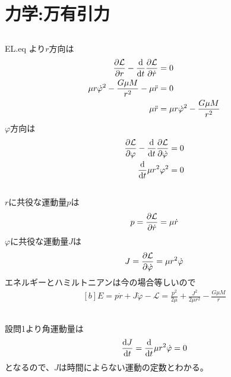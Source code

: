 \documentclass[../../sp_2018.tex]{subfiles}
\begin{document}
\setcounter{section}{2}
\section{力学:万有引力}
\subsection{}
EL.eq より\(r\)方向は
\begin{equation}\begin{aligned}[b]
    \pdv{\mathcal{L}}{r}-\dv{t}\pdv{\mathcal{L}}{\dot{r}} &=0\\
    \mu r\dot{\varphi}^2-\frac{G\mu M}{r^2} -\mu\ddot{r} &=0\\
    \mu\ddot{r} &= \mu r\dot{\varphi}^2 - \frac{G\mu M}{r^2}
\end{aligned}\end{equation}
\(\varphi\)方向は
\begin{equation}\begin{aligned}[b]
    \pdv{\mathcal{L}}{\varphi}-\dv{t} \pdv{\mathcal{L}}{\dot{\varphi}} &= 0\\
    \dv{t}\mu r^2\varphi^2 &= 0
\end{aligned}\end{equation}

\subsection{}
\(r\)に共役な運動量\(p\)は
\begin{equation}\begin{aligned}[b]
    p = \pdv{\mathcal{L}}{\dot{r}} = \mu\dot{r}
\end{aligned}\end{equation}
\(\varphi\)に共役な運動量\(J\)は
\begin{equation}\begin{aligned}[b]
    J = \pdv{\mathcal{L}}{\dot{\varphi}} = \mu r^2\dot{\varphi}
\end{aligned}\end{equation}
エネルギーとハミルトニアンは今の場合等しいので
\begin{equation}\begin{aligned}[b]
    E = p\dot{r} + J\dot{\varphi} -\mathcal{L} = \frac{p^2}{2\mu}+\frac{J^2}{2\mu r^2}-\frac{G\mu M}{r}
\end{aligned}\end{equation}

\subsection{}
設問1より角運動量は
\begin{equation}\begin{aligned}[b]
    \dv{J}{t} = \dv{t} \mu r^2\dot{\varphi} = 0
\end{aligned}\end{equation}
となるので、\(J\)は時間によらない運動の定数とわかる。
\end{document}
